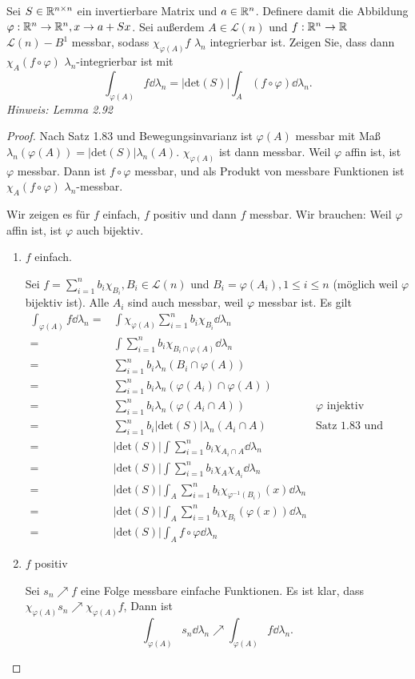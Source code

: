 \begin{Problem}
	Sei $S\in \mathbb{R}^{n\times n}$ ein invertierbare Matrix und $a\in \mathbb{R}^n$. Definere damit die Abbildung $\varphi:\mathbb{R}^n\to \mathbb{R}^n, x\to a+Sx$. Sei außerdem $A\in \mathcal{L}(n)$ und $f:\mathbb{R}^n\to \mathbb{R}$ $\mathcal{L}(n)-B^1$ messbar, sodass $\chi_{\varphi(A)}f$ $\lambda_n$ integrierbar ist. Zeigen Sie, dass dann $\chi_A(f\circ \varphi)$ $\lambda_n$-integrierbar ist mit
	\[
		\int_{\varphi(A)}f\dd{\lambda_n}=|\text{det}(S)|\int_A (f\circ\varphi) \dd{\lambda_n}
	.\] 
	{\footnotesize \emph{Hinweis: Lemma 2.92}}
\end{Problem}
\begin{proof}
	Nach Satz 1.83 und Bewegungsinvarianz ist $\varphi(A)$ messbar mit Maß $\lambda_n(\varphi(A))=|\text{det}(S)|\lambda_n(A)$. $\chi_{\varphi(A)}$ ist dann messbar. Weil $\varphi$ affin ist, ist $\varphi$ messbar. Dann ist $f\circ\varphi$ messbar, und als Produkt von messbare Funktionen ist $\chi_A(f\circ \varphi)$ $\lambda_n$-messbar.

	Wir zeigen es f\"{u}r $f$ einfach, $f$ positiv und dann $f$ messbar. Wir brauchen: Weil $\varphi$ affin ist, ist $\varphi$ auch bijektiv. 
	\begin{enumerate}[label=(\roman*)]
		\item $f$ einfach. 

			Sei $f=\sum_{i=1}^n b_i\chi_{B_i},B_i\in \mathcal{L}(n)$ und $B_i=\varphi(A_i),1\le i\le n$ (möglich weil $\varphi$ bijektiv ist). Alle $A_i$ sind auch messbar, weil $\varphi$ messbar ist. Es gilt
			\begin{align*}
				\int_{\varphi(A)}f\dd{\lambda_n}=&\int \chi_{\varphi(A)}\sum_{i=1}^n b_i \chi_{B_i}\dd{\lambda_n}\\
				=&\int\sum_{i=1}^n b_i\chi_{B_i\cap \varphi(A)}\dd{\lambda_n}\\
				=&\sum_{i=1}^n b_i\lambda_n(B_i\cap \varphi(A))\\
				=&\sum_{i=1}^n b_i\lambda_n(\varphi(A_i)\cap \varphi(A))\\
				=&\sum_{i=1}^n b_i \lambda_n(\varphi(A_i\cap A)) & \varphi\text{ injektiv}\\
				=&\sum_{i=1}^n b_i|\text{det}(S)|\lambda_n(A_i\cap A) & \text{Satz 1.83 und Bewegungsinvarianz}\\
				=&|\text{det}(S)|\int\sum_{i=1}^n b_i\chi_{A_i\cap A}\dd{\lambda_n}\\
				=&|\text{det}(S)|\int\sum_{i=1}^n b_i \chi_{A}\chi_{A_i}\dd{\lambda_n}\\
				=&|\text{det}(S)|\int_A\sum_{i=1}^n b_i\chi_{\varphi^{-1}(B_i)}(x)\dd{\lambda_n}\\
				=&|\text{det}(S)|\int_A\sum_{i=1}^n b_i\chi_{B_i}(\varphi(x))\dd{\lambda_n}\\
				=&|\text{det}(S)|\int_A f\circ \varphi\dd{\lambda_n}
			\end{align*}
		\item $f$ positiv

			Sei $s_n\nearrow f$ eine Folge messbare einfache Funktionen. Es ist klar, dass $\chi_{\varphi(A)}s_n\nearrow \chi_{\varphi(A)} f$, Dann ist
			\[
				\int_{\varphi(A)}s_n\dd{\lambda_n}\nearrow \int_{\varphi(A)}f\dd{\lambda_n}
			.\] 
	\end{enumerate}
\end{proof}
